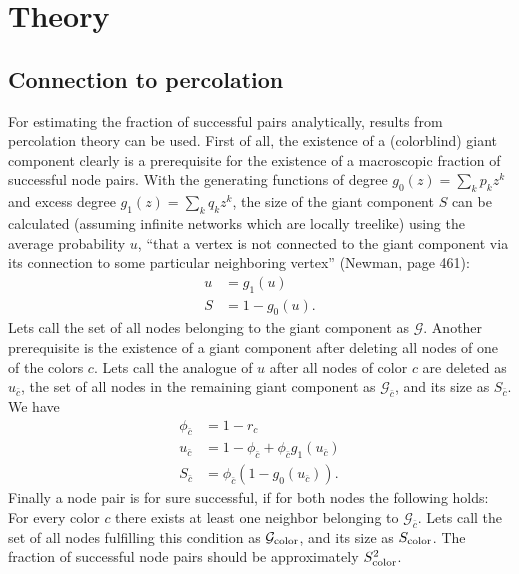 \documentclass[aps, pre, onecolumn, a4paper, floatfix]{revtex4}
\begin{document}
\section{Theory}

\subsection{Connection to percolation}

For estimating the fraction of successful pairs analytically, results from percolation 
theory can be used. First of all, the existence of a (colorblind) giant component clearly is a 
prerequisite for the existence of a macroscopic fraction of successful node pairs. With the 
generating functions of degree $g_0(z)=\sum_k p_k z^k$ and excess degree 
$g_1(z)=\sum_k q_k z^k$, the size of the giant component $S$ can be calculated (assuming infinite
networks which are locally treelike) using 
the average probability $u$, ``that a vertex is not connected to the giant component 
via its connection to some particular neighboring vertex'' (Newman, page 461): 
\begin{align}
u &= g_1(u)\\
S &= 1 - g_0(u).
\end{align}
Lets call the set of all nodes belonging to the giant component as ${\mathcal G}$. 
Another prerequisite is the existence of a giant component after deleting all nodes of one 
of the colors $c$. Lets call the analogue of $u$ after all nodes of color $c$ are 
deleted as $u_{\bar c}$, the set of all nodes in the remaining giant component as 
${\mathcal G}_{\bar c}$, and its size as $S_{\bar c}$. 
We have 
\begin{align}
\phi_{\bar c} &= 1-r_c\\
u_{\bar c} &= 1-\phi_{\bar c} + \phi_{\bar c} g_1(u_{\bar c})\label{eq:u_c}\\
S_{\bar c} &= \phi_{\bar c} (1-g_0(u_{\bar c})).
\end{align}
Finally a node pair is for sure successful, if for both nodes the following 
holds: For every color $c$ there exists at least one neighbor belonging to 
${\mathcal G}_{\bar c}$. Lets call the set of all nodes fulfilling this 
condition as ${\mathcal G}_{\rm color}$, and its size as $S_{\rm color}$. 
The fraction of successful node pairs should be approximately $S_{\rm color}^2$. 
\end{document}
